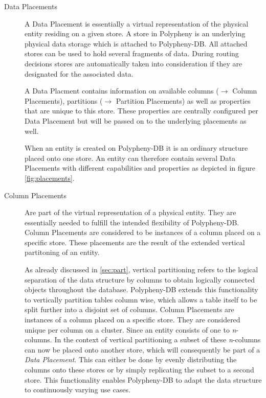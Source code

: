 \begin{description}
    \item [Data Placements] A Data Placement is essentially a virtual representation of the physical entity residing on a given store.
    A store in Polypheny is an underlying physical data storage which is attached to Polypheny-DB.
    All attached stores can be used to hold several fragments of data. 
    During routing decisions stores are automatically taken into consideration if they are designated for the associated data.
    
    A Data Placment contains information on available columns ($\rightarrow$ Column Placements), partitions ($\rightarrow$ Partition Placements)
    as well as properties that are unique to this store. These properties are centrally configured per Data Placement but will be passed on to the underlying placements as well.
    
    When an entity is created on Polypheny-DB it is an ordinary structure placed onto one store.
    An entity can therefore contain several Data Placements with different capabilities and properties as depicted in figure \ref{fig:placements}. 
    
    

    \item [Column Placements]
    Are part of the virtual representation of a physical entity. They are essentially needed to fulfill the intended flexibility of Polypheny-DB. 
    Column Placements are considered to be instances of a column placed on a specific store.
    These placements are the result of the extended vertical partitoning of an entity.


    As already discussed in \ref{sec:part}, vertical partitioning refers to the logical 
    separation of the data structure by columns to obtain logically connected objects throughout 
    the database. Polypheny-DB extends this functionality to vertically partition tables
    column wise, which allows a table itself to be split further into a disjoint 
    set of columns.
    Column Placements are instances of a column placed on a specific store.
    They are considered unique per column on a cluster.
    Since an entity consists of one to \textit{n}-columns.
    In the context of vertical partitioning a subset of these \textit{n}-columns can now 
    be placed onto another store, which will consequently be part of a \textit{Data Placement}.
    This can either be done by evenly distributing the columns onto these stores 
    or by simply replicating the subset to a second store.
    This functionality enables Polypheny-DB to adapt the data structure to continuously 
    varying use cases.\\


\end{description}
